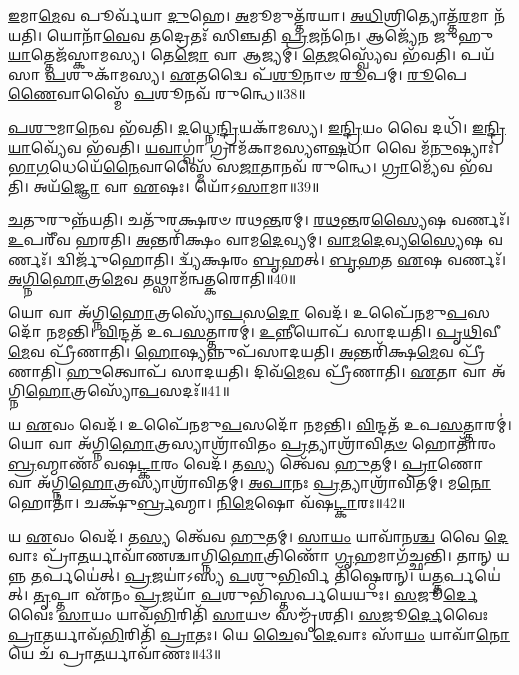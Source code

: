 \-\ul{𑌇}\-𑌮𑌾\-\ul{𑌮𑍇}\-𑌵 𑌪𑍂𑌰𑍍𑌵᳴𑌯𑌾 \ul{𑌦𑍁}\-𑌹𑍇।
\-\ul{𑌅}\-𑌮𑍂𑌮𑍁𑌤𑍍𑌤᳴𑌰𑌯𑌾।
\-\ul{𑌅}\-\-\ul{𑌧𑌿}\-𑌶𑍍𑌰𑌿𑌤𑍍𑌯𑍋𑌤𑍍𑌤᳴\-\ul{𑌰}\-𑌮𑌾 𑌨᳴𑌯𑌤𑌿।
𑌯𑍋𑌨𑌾᳴\-\ul{𑌵𑍇}\-𑌵 𑌤𑌦𑍍𑌰𑍇𑌤𑌃᳴ 𑌸𑌿𑌞𑍍𑌚𑌤𑌿 \ul{𑌪𑍍𑌰}\-𑌜𑌨᳴𑌨𑍇।
𑌆𑌜𑍍𑌯𑍇᳴𑌨 𑌜𑍁𑌹𑍁\-\ul{𑌯𑌾}\-𑌤𑍍𑌤𑍇𑌜᳴𑌸𑍍𑌕𑌾𑌮𑌸𑍍𑌯।
𑌤𑍇\-\ul{𑌜𑍋} 𑌵𑌾 𑌆𑌜𑍍𑌯𑌮𑍍॑।
\-\ul{𑌤𑍇}\-\-\ul{𑌜}\-𑌸𑍍𑌵𑍍𑌯𑍇᳴𑌵 𑌭᳴𑌵𑌤𑌿।
𑌪𑌯᳴𑌸𑌾 \ul{𑌪}\-𑌶𑍁𑌕𑌾᳴𑌮𑌸𑍍𑌯।
\-\ul{𑌏}\-𑌤𑌦𑍍𑌵𑍈 𑌪᳴\-\ul{𑌶𑍂}\-𑌨𑌾𑍞 \ul{𑌰𑍂}\-𑌪𑌮𑍍।
\-\ul{𑌰𑍂}\-𑌪𑍇\-\ul{𑌣𑍈}\-𑌵𑌾𑌸𑍍𑌮𑍈᳴ \ul{𑌪}\-𑌶𑍂𑌨𑌵᳴ 𑌰𑍁𑌨𑍍𑌧𑍇॥38॥

\-\ul{𑌪}\-\-\ul{𑌶𑍁}\-𑌮𑌾\-\ul{𑌨𑍇}\-𑌵 𑌭᳴𑌵𑌤𑌿।
\-\ul{𑌦}\-𑌧𑍍𑌨𑍇\-\ul{𑌨𑍍𑌦𑍍𑌰𑌿}\-𑌯𑌕𑌾᳴𑌮𑌸𑍍𑌯।
\-\ul{𑌇}\-\-\ul{𑌨𑍍𑌦𑍍𑌰𑌿}\-𑌯𑌂 𑌵𑍈 𑌦𑌧𑌿᳴।
\-\ul{𑌇}\-\-\ul{𑌨𑍍𑌦𑍍𑌰𑌿}\-\-\ul{𑌯𑌾}\-𑌵𑍍𑌯𑍇᳴𑌵 𑌭᳴𑌵𑌤𑌿।
\-\ul{𑌯}\-\-\ul{𑌵𑌾}\-𑌗𑍍𑌵𑌾॑ 𑌗𑍍𑌰𑌾𑌮᳴𑌕𑌾𑌮𑌸𑍍𑌯𑍗\-\ul{𑌷}\-𑌧𑌾 𑌵𑍈 𑌮᳴\-\ul{𑌨𑍁}\-𑌷𑍍𑌯𑌾𑌃॑।
\-\ul{𑌭𑌾}\-\-\ul{𑌗}\-𑌧𑍇𑌯𑍇᳴\-\ul{𑌨𑍈}\-𑌵𑌾𑌸𑍍𑌮𑍈᳴ 𑌸\-\ul{𑌜𑌾}\-𑌤𑌾𑌨𑌵᳴ 𑌰𑍁𑌨𑍍𑌧𑍇।
\-\ul{𑌗𑍍𑌰𑌾}\-𑌮𑍍𑌯𑍇᳴𑌵 𑌭᳴𑌵𑌤𑌿।
𑌅𑌯᳴\-\ul{𑌜𑍍𑌞𑍋} 𑌵𑌾 \ul{𑌏}\-𑌷𑌃।
𑌯𑍋᳴𑌽\-\ul{𑌸𑌾}\-𑌮𑌾॥39॥

\-\ul{𑌚}\-𑌤𑍁𑌰𑍁𑌨𑍍𑌨᳴𑌯𑌤𑌿।
𑌚𑌤𑍁᳴𑌰𑌕𑍍𑌷𑌰𑍞 𑌰𑌥\-\ul{𑌨𑍍𑌤}\-𑌰𑌮𑍍।
\-\ul{𑌰}\-\-\ul{𑌥}\-\-\ul{𑌨𑍍𑌤}\-𑌰\-\ul{𑌸𑍍𑌯𑍈}\-𑌷 𑌵𑌰𑍍𑌣𑌃᳴।
\-\ul{𑌉}\-𑌪𑌰𑍀᳴𑌵 𑌹𑌰𑌤𑌿।
\-\ul{𑌅}\-𑌨𑍍𑌤𑌰𑌿᳴𑌕𑍍𑌷𑌂 𑌵𑌾𑌮\-\ul{𑌦𑍇}\-𑌵𑍍𑌯𑌮𑍍।
\-\ul{𑌵𑌾}\-\-\ul{𑌮}\-\-\ul{𑌦𑍇}\-𑌵𑍍𑌯\-\ul{𑌸𑍍𑌯𑍈}\-𑌷 𑌵𑌰𑍍𑌣𑌃᳴।
𑌦𑍍𑌵𑌿𑌰𑍍𑌜𑍁᳴𑌹𑍋𑌤𑌿।
𑌦𑍍𑌵𑍍𑌯᳴𑌕𑍍𑌷𑌰𑌂 \ul{𑌬𑍃}\-𑌹𑌤𑍍।
\-\ul{𑌬𑍃}\-\-\ul{𑌹}\-𑌤 \ul{𑌏}\-𑌷 𑌵𑌰𑍍𑌣𑌃᳴।
\-\ul{𑌅}\-\-\ul{𑌗𑍍𑌨𑌿}\-\-\ul{𑌹𑍋}\-𑌤𑍍𑌰\-\ul{𑌮𑍇}\-𑌵 𑌤𑌥𑍍𑌸𑌾𑌮᳴𑌨𑍍𑌵𑌤𑍍𑌕𑌰𑍋𑌤𑌿॥40॥

𑌯𑍋 𑌵𑌾 𑌅᳴𑌗𑍍𑌨𑌿\-\ul{𑌹𑍋}\-𑌤𑍍𑌰𑌸𑍍𑌯𑍋᳴\-\ul{𑌪}\-𑌸\-\ul{𑌦𑍋} 𑌵𑍇𑌦᳴।
𑌉𑌪𑍈᳴𑌨𑌮𑍁\-\ul{𑌪}\-𑌸𑌦𑍋᳴ 𑌨𑌮𑌨𑍍𑌤𑌿।
\-\ul{𑌵𑌿}\-𑌨𑍍𑌦𑌤᳴ 𑌉𑌪\-\ul{𑌸}\-𑌤𑍍𑌤𑌾𑌰𑌮𑍍॑।
\-\ul{𑌉}\-𑌨𑍍𑌨𑍀𑌯𑍋𑌪᳴ 𑌸𑌾𑌦𑌯𑌤𑌿।
\-\ul{𑌪𑍃}\-\-\ul{𑌥𑌿}\-𑌵𑍀\-\ul{𑌮𑍇}\-𑌵 𑌪𑍍𑌰𑍀᳴𑌣𑌾𑌤𑌿।
\-\ul{𑌹𑍋}\-𑌷𑍍𑌯𑌨𑍍𑌨𑍁𑌪᳴𑌸𑌾𑌦𑌯𑌤𑌿।
\-\ul{𑌅}\-𑌨𑍍𑌤𑌰𑌿᳴𑌕𑍍𑌷\-\ul{𑌮𑍇}\-𑌵 𑌪𑍍𑌰𑍀᳴𑌣𑌾𑌤𑌿।
\-\ul{𑌹𑍁}\-𑌤𑍍𑌵𑍋𑌪᳴ 𑌸𑌾𑌦𑌯𑌤𑌿।
𑌦𑌿𑌵᳴\-\ul{𑌮𑍇}\-𑌵 𑌪𑍍𑌰𑍀᳴𑌣𑌾𑌤𑌿।
\-\ul{𑌏}\-𑌤𑌾 𑌵𑌾 𑌅᳴𑌗𑍍𑌨𑌿\-\ul{𑌹𑍋}\-𑌤𑍍𑌰𑌸𑍍𑌯𑍋᳴\-\ul{𑌪}\-𑌸𑌦𑌃᳴॥41॥

𑌯 \ul{𑌏}\-𑌵𑌂 𑌵𑍇𑌦᳴।
𑌉𑌪𑍈᳴𑌨𑌮𑍁\-\ul{𑌪}\-𑌸𑌦𑍋᳴ 𑌨𑌮𑌨𑍍𑌤𑌿।
\-\ul{𑌵𑌿}\-𑌨𑍍𑌦𑌤᳴ 𑌉𑌪\-\ul{𑌸}\-𑌤𑍍𑌤𑌾𑌰𑌮𑍍॑।
𑌯𑍋 𑌵𑌾 𑌅᳴𑌗𑍍𑌨𑌿\-\ul{𑌹𑍋}\-𑌤𑍍𑌰𑌸𑍍𑌯𑌾𑌶𑍍𑌰𑌾᳴𑌵𑌿𑌤𑌂 \ul{𑌪𑍍𑌰}\-𑌤𑍍𑌯𑌾𑌶𑍍𑌰𑌾᳴𑌵𑌿\-\ul{𑌤}\-\-\ul{𑍞} 𑌹𑍋𑌤𑌾᳴𑌰𑌂 \ul{𑌬𑍍𑌰}\-𑌹𑍍𑌮𑌾𑌣𑌂᳴ 𑌵𑌷\-\ul{𑌟𑍍𑌕𑌾}\-𑌰𑌂 𑌵𑍇𑌦᳴।
𑌤\-\ul{𑌸𑍍𑌯} 𑌤𑍍𑌵𑍇᳴𑌵 \ul{𑌹𑍁}\-𑌤𑌮𑍍।
\-\ul{𑌪𑍍𑌰𑌾}\-𑌣𑍋 𑌵𑌾 𑌅᳴𑌗𑍍𑌨𑌿\-\ul{𑌹𑍋}\-𑌤𑍍𑌰𑌸𑍍𑌯𑌾𑌶𑍍𑌰𑌾᳴𑌵𑌿𑌤𑌮𑍍।
\-\ul{𑌅}\-\-\ul{𑌪𑌾}\-𑌨𑌃 \ul{𑌪𑍍𑌰}\-𑌤𑍍𑌯𑌾𑌶𑍍𑌰𑌾᳴𑌵𑌿𑌤𑌮𑍍।
𑌮\-\ul{𑌨𑍋} 𑌹𑍋𑌤𑌾॑।
𑌚𑌕𑍍𑌷𑍁᳴\-\ul{𑌰𑍍𑌬𑍍𑌰}\-𑌹𑍍𑌮𑌾।
\-\ul{𑌨𑌿}\-\-\ul{𑌮𑍇}\-𑌷𑍋 𑌵᳴𑌷\-\ul{𑌟𑍍𑌕𑌾}\-𑌰𑌃॥42॥

𑌯 \ul{𑌏}\-𑌵𑌂 𑌵𑍇𑌦᳴।
𑌤\-\ul{𑌸𑍍𑌯} 𑌤𑍍𑌵𑍇᳴𑌵 \ul{𑌹𑍁}\-𑌤𑌮𑍍।
\-\ul{𑌸𑌾}\-\-\ul{𑌯𑌂} 𑌯𑌾𑌵𑌾᳴𑌨\-\ul{𑌶𑍍𑌚} 𑌵𑍈 \ul{𑌦𑍇}\-𑌵𑌾𑌃 𑌪𑍍𑌰𑌾᳴\-\ul{𑌤}\-𑌰𑍍𑌯𑌾𑌵𑌾᳴𑌣𑌶𑍍𑌚𑌾𑌗𑍍𑌨𑌿\-\ul{𑌹𑍋}\-𑌤𑍍𑌰𑌿𑌣𑍋᳴ \ul{𑌗𑍃}\-𑌹𑌮𑌾𑌗᳴𑌚𑍍𑌛𑌨𑍍𑌤𑌿।
𑌤𑌾𑌨𑍍 𑌯𑌨𑍍𑌨 \ul{𑌤}\-𑌰𑍍𑌪𑌯𑍇॑𑌤𑍍।
\-\ul{𑌪𑍍𑌰}\-𑌜𑌯𑌾॑𑌽𑌸𑍍𑌯 \ul{𑌪}\-𑌶𑍁\-\ul{𑌭𑌿}\-𑌰𑍍𑌵𑌿 𑌤𑌿᳴𑌷𑍍𑌠𑍇𑌰𑌨𑍍।
𑌯\-\ul{𑌤𑍍𑌤}\-𑌰𑍍𑌪𑌯𑍇॑𑌤𑍍।
\-\ul{𑌤𑍃}\-𑌪𑍍𑌤𑌾 𑌏᳴𑌨𑌂 \ul{𑌪𑍍𑌰}\-𑌜𑌯𑌾᳴ \ul{𑌪}\-𑌶𑍁𑌭𑌿᳴𑌸𑍍𑌤𑌰𑍍𑌪𑌯𑍇𑌯𑍁𑌃।
\-\ul{𑌸}\-𑌜𑍂\-\ul{𑌰𑍍𑌦𑍇}\-𑌵𑍈𑌃 \ul{𑌸𑌾}\-𑌯𑌂 𑌯𑌾𑌵᳴\-\ul{𑌭𑌿}\-𑌰𑌿𑌤𑌿᳴ \ul{𑌸𑌾}\-𑌯𑍞 𑌸𑌮𑍍𑌮𑍃᳴𑌶𑌤𑌿।
\-\ul{𑌸}\-𑌜𑍂\-\ul{𑌰𑍍𑌦𑍇}\-𑌵𑍈𑌃 \ul{𑌪𑍍𑌰𑌾}\-𑌤𑌰𑍍𑌯𑌾𑌵᳴\-\ul{𑌭𑌿}\-𑌰𑌿𑌤𑌿᳴ \ul{𑌪𑍍𑌰𑌾}\-𑌤𑌃।
𑌯𑍇 \ul{𑌚𑍈}\-𑌵 \ul{𑌦𑍇}\-𑌵𑌾𑌃 𑌸𑌾᳴\-\ul{𑌯𑌂} 𑌯𑌾𑌵𑌾᳴\-\ul{𑌨𑍋} 𑌯𑍇 𑌚᳴ 𑌪𑍍𑌰𑌾\-\ul{𑌤}\-𑌰𑍍𑌯𑌾𑌵𑌾᳴𑌣𑌃॥43॥

